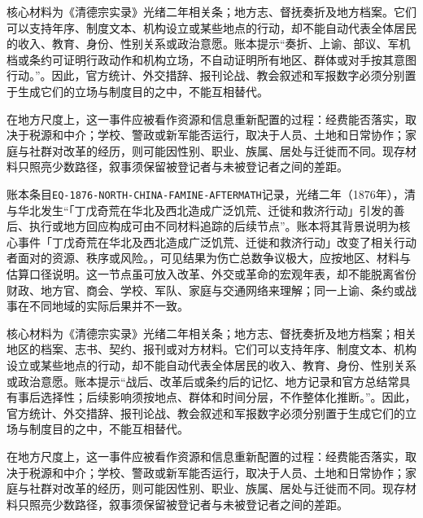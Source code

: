 核心材料为《清德宗实录》光绪二年相关条；地方志、督抚奏折及地方档案。它们可以支持年序、制度文本、机构设立或某些地点的行动，却不能自动代表全体居民的收入、教育、身份、性别关系或政治意愿。账本提示“奏折、上谕、部议、军机档或条约可证明行政动作和机构立场，不自动证明所有地区、群体或对手按其意图行动。”。因此，官方统计、外交措辞、报刊论战、教会叙述和军报数字必须分别置于生成它们的立场与制度目的之中，不能互相替代。

在地方尺度上，这一事件应被看作资源和信息重新配置的过程：经费能否落实，取决于税源和中介；学校、警政或新军能否运行，取决于人员、土地和日常协作；家庭与社群对改革的经历，则可能因性别、职业、族属、居处与迁徙而不同。现存材料只照亮少数路径，叙事须保留被登记者与未被登记者之间的差距。

账本条目\texttt{EQ-1876-NORTH-CHINA-FAMINE-AFTERMATH}记录，光绪二年（1876年），清与华北发生“「丁戊奇荒在华北及西北造成广泛饥荒、迁徙和救济行动」引发的善后、执行或地方回应构成可由不同材料追踪的后续节点”。账本将其背景说明为核心事件「丁戊奇荒在华北及西北造成广泛饥荒、迁徙和救济行动」改变了相关行动者面对的资源、秩序或风险。，可见结果为伤亡总数争议极大，应按地区、材料与估算口径说明。这一节点虽可放入改革、外交或革命的宏观年表，却不能脱离省份财政、地方官、商会、学校、军队、家庭与交通网络来理解；同一上谕、条约或战事在不同地域的实际后果并不一致。

核心材料为《清德宗实录》光绪二年相关条；地方志、督抚奏折及地方档案；相关地区的档案、志书、契约、报刊或对方材料。它们可以支持年序、制度文本、机构设立或某些地点的行动，却不能自动代表全体居民的收入、教育、身份、性别关系或政治意愿。账本提示“战后、改革后或条约后的记忆、地方记录和官方总结常具有事后选择性；后续影响须按地点、群体和时间分层，不作整体化推断。”。因此，官方统计、外交措辞、报刊论战、教会叙述和军报数字必须分别置于生成它们的立场与制度目的之中，不能互相替代。

在地方尺度上，这一事件应被看作资源和信息重新配置的过程：经费能否落实，取决于税源和中介；学校、警政或新军能否运行，取决于人员、土地和日常协作；家庭与社群对改革的经历，则可能因性别、职业、族属、居处与迁徙而不同。现存材料只照亮少数路径，叙事须保留被登记者与未被登记者之间的差距。
